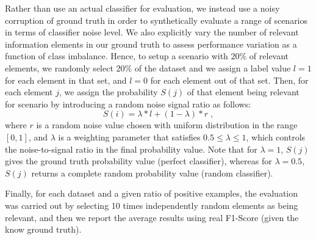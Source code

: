 Rather than use an actual classifier for evaluation, we instead use a noisy corruption of ground truth in order to synthetically evaluate a range of scenarios in terms of classifier noise level.
We also explicitly vary the number of relevant information elements in our ground truth to assess performance variation as a function of class imbalance.  Hence, to setup a scenario with 20\% of relevant elements, we randomly select 20\% of the dataset and we assign a label value $l=1$ for each element in that set, and $l=0$ for each element out of that set. Then, for each element $j$, we assign the probability $S(j)$ of that element being relevant for scenario by introducing a random noise signal ratio as follows:
\begin{equation}
S(i) = \lambda*l+(1-\lambda)*r \; ,
\end{equation}
where $r$ is a random noise value chosen with uniform distribution in the range $[0,1]$, and $\lambda$ is a weighting parameter  that satisfies $0.5 \leq \lambda \leq 1$, which controls the noise-to-signal ratio in the final probability value. Note that for $\lambda=1$, $S(j)$ gives the ground truth probability value (perfect classifier), whereas for $\lambda=0.5$, $S(j)$ returns a complete random probability value (random classifier).


Finally, for each dataset and a given ratio of positive examples, the evaluation was carried out by selecting 10 times independently random elements as being relevant, and then we report the average results using real F1-Score (given the know ground truth).




